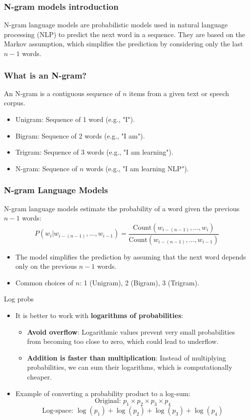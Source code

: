 \documentclass{beamer}
\begin{document}
\begin{frame}
\frametitle{N-gram models introduction}
N-gram language models are probabilistic models used in natural language processing (NLP) to predict the next word in a sequence. They are based on the Markov assumption, which simplifies the prediction by considering only the last \( n-1 \) words.
\end{frame}

\begin{frame}
\frametitle{What is an N-gram?}
An N-gram is a contiguous sequence of \( n \) items from a given text or speech corpus.
\begin{itemize}
    \item Unigram: Sequence of 1 word (e.g., "I").
    \item Bigram: Sequence of 2 words (e.g., "I am").
    \item Trigram: Sequence of 3 words (e.g., "I am learning").
    \item N-gram: Sequence of \( n \) words (e.g., "I am learning NLP").
\end{itemize}
\end{frame}

\begin{frame}
\frametitle{N-gram Language Models}
N-gram language models estimate the probability of a word given the previous \( n-1 \) words:
\[
P(w_i | w_{i-(n-1)}, \dots, w_{i-1}) = \frac{\text{Count}(w_{i-(n-1)}, \dots, w_i)}{\text{Count}(w_{i-(n-1)}, \dots, w_{i-1})}
\]
\begin{itemize}
    \item The model simplifies the prediction by assuming that the next word depends only on the previous \( n-1 \) words.
    \item Common choices of \( n \): 1 (Unigram), 2 (Bigram), 3 (Trigram).
\end{itemize}
\end{frame}

\begin{frame}{Log probs}
    \begin{itemize}
        \item It is better to work with \textbf{logarithms of probabilities}:
        \begin{itemize}
            \item \textbf{Avoid overflow}: Logarithmic values prevent very small probabilities from becoming too close to zero, which could lead to underflow.
            \item \textbf{Addition is faster than multiplication}: Instead of multiplying probabilities, we can sum their logarithms, which is computationally cheaper.
        \end{itemize}
        \vspace{0.5cm}
        \item Example of converting a probability product to a log-sum:
        \[
        \text{Original: } p_1 \times p_2 \times p_3 \times p_4
        \]
        \[
        \text{Log-space: } \log(p_1) + \log(p_2) + \log(p_3) + \log(p_4)
        \]
    \end{itemize}
\end{frame}
\end{document}
